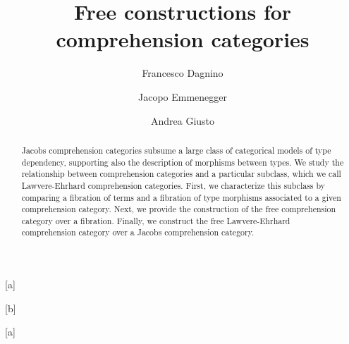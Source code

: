 \documentclass{lmcs} %
\theoremstyle{plain}\newtheorem{satz}[thm]{Satz} %
\def\eg{{\em e.g.}}
\begin{document}
\title[Free constructions for comprehension categories]{Free constructions for comprehension categories}

\author[F.~Dagnino]{Francesco Dagnino}[a]
\author[J.~Emmenegger]{Jacopo Emmenegger}[b]
\author[A.~Giusto]{Andrea Giusto}[a]

\address{University of Genoa, DIBRIS, Italy}	%

\address{University of Genoa, DIMA, Italy}	%





\begin{abstract}
	\noindent 
% 
Jacobs comprehension categories subsume a large class of categorical models of type dependency, 
supporting also the description of morphisms between types.
% 
We study the relationship between comprehension categories and a particular subclass, which we call Lawvere-Ehrhard comprehension categories. 
First, we characterize this subclass by comparing a fibration of terms and a fibration of type morphisms associated to a given comprehension category. 
Next, we provide the construction of the free comprehension category over a fibration. 
Finally, we construct the free Lawvere-Ehrhard comprehension category over a Jacobs comprehension category.
% 
\end{abstract}
\end{document}
